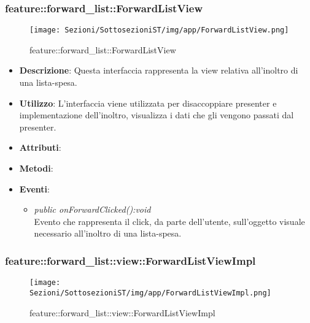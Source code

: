 \subsubsection{feature::forward\_list::ForwardListView}

\label{feature::forward_list::ForwardListView}
\begin{figure}[ht]
	\centering
	\texttt{[image: Sezioni/SottosezioniST/img/app/ForwardListView.png]}
	\caption{feature::forward\_list::ForwardListView}
\end{figure}

\begin{itemize}
\item \textbf{Descrizione}: Questa interfaccia rappresenta la view relativa all'inoltro di una lista-spesa.
\item \textbf{Utilizzo}: L'interfaccia viene utilizzata per disaccoppiare presenter e implementazione dell'inoltro, visualizza i dati che gli vengono passati dal presenter.
\item \textbf{Attributi}: 
\item \textbf{Metodi}:
\item \textbf{Eventi}:
\begin{itemize}
\item \textit{public onForwardClicked():void}\\
	Evento che rappresenta il click, da parte dell'utente, sull'oggetto visuale necessario all'inoltro di una lista-spesa.
\end{itemize}
\end{itemize}

\subsubsection{feature::forward\_list::view::ForwardListViewImpl}

\label{feature::forward_list::view::ForwardListViewImpl}
\begin{figure}[ht]
	\centering
	\texttt{[image: Sezioni/SottosezioniST/img/app/ForwardListViewImpl.png]}
	\caption{feature::forward\_list::view::ForwardListViewImpl}
\end{figure}

